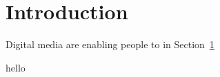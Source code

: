 \documentclass[main]{subfiles}
\begin{document}
\section{Introduction}\label{sec:introduction}
Digital media are enabling people to 
\cite{dynamo} in Section~\ref{sec:introduction}

hello
\onlyinsubfile{\printbibliography{}}
\end{document}
